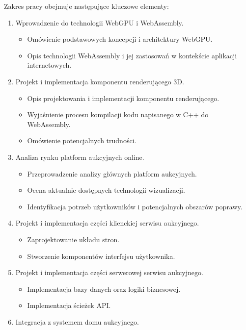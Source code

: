 Zakres pracy obejmuje następujące kluczowe elementy:
\begin{enumerate}
  \item Wprowadzenie do technologii WebGPU i WebAssembly.
        \begin{itemize}
          \item Omówienie podstawowych koncepcji i architektury WebGPU.
          \item Opis technologii WebAssembly i jej zastosowań w kontekście aplikacji internetowych.
        \end{itemize}
  \item Projekt i implementacja komponentu renderującego 3D.
        \begin{itemize}
          \item Opis projektowania i implementacji komponentu renderującego.
          \item Wyjaśnienie procesu kompilacji kodu napisanego w C++ do WebAssembly.
          \item Omówienie potencjalnych trudności.
        \end{itemize}
  \item Analiza rynku platform aukcyjnych online.
        \begin{itemize}
          \item Przeprowadzenie analizy głównych platform aukcyjnych.
          \item Ocena aktualnie dostępnych technologii wizualizacji.
          \item Identyfikacja potrzeb użytkowników i potencjalnych obszarów poprawy.
        \end{itemize}
  \item Projekt i implementacja części klienckiej serwisu aukcyjnego.
        \begin{itemize}
          \item Zaprojektowanie układu stron.
          \item Stworzenie komponentów interfejsu użytkownika.
        \end{itemize}
  \item Projekt i implementacja części serwerowej serwisu aukcyjnego.
        \begin{itemize}
          \item Implementacja bazy danych oraz logiki biznesowej.
          \item Implementacja ścieżek API.
        \end{itemize}
  \item Integracja z systemem domu aukcyjnego.

\end{enumerate}
